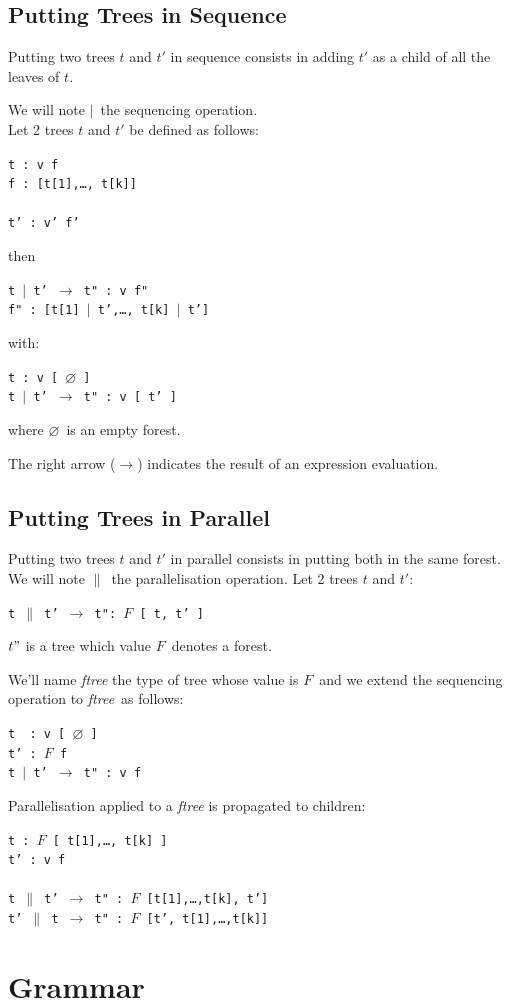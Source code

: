 \documentclass{article}
\newcommand{\op}	[1]		{\vspace{0mm}\begin{center}\colorbox{mygrey}{
							\begin{minipage}[t]{0.9\columnwidth} 
							{\small \texttt{#1}}
							\end{minipage}}\end{center}}
\newcommand{\nulltree}	{\ensuremath{\varnothing}}
\newcommand{\seq}		{\ensuremath{|}}
\newcommand{\paral}		{\ensuremath{\parallel}}
\newcommand{\foret}		{\ensuremath{F}}
\newcommand{\ftree}		{ftree}
\newcommand{\etc}		{…}
\begin{document}
\subsection{Putting Trees in Sequence}
Putting two trees $t$ and $t'$ in sequence consists in adding $t'$ as a child of all the leaves of $t$.


We will note \seq\ the sequencing operation. \\
Let 2 trees $t$ and $t'$ be defined as follows:
\op{t :  v f \\
f : [t[1],\etc, t[k]] \\
\\
t' :  v' f'
}
then
\op{t \seq\ t'  $\to$  t" : v f" \\
f" : [t[1] \seq\ t',\etc, t[k] \seq\ t']
}
with: 
\op{t :  v [ \nulltree\ ]\\
t \seq\ t'  $\to$  t" : v [ t' ]
}
where \nulltree\ is an empty forest.

The right arrow ($\to$) indicates the result of an expression evaluation.

\subsection{Putting Trees in Parallel}
Putting two trees $t$ and $t'$ in parallel consists in putting both in the same forest.
We will note \paral\ the parallelisation operation. 
Let 2 trees $t$ and $t'$:
\op{t \paral\ t'  $\to$  t": \foret\ [ t, t' ]
}
$t"$ is a tree which value \foret\ denotes a forest. 

We'll name \emph{\ftree} the type of tree whose value is \foret\ and we extend the sequencing operation to \emph{\ftree}\ as follows:
\op{t \ :  v [ \nulltree\ ]\\
t' :  \foret\ f\\
t \seq\ t'  $\to$  t" : v f
}

Parallelisation applied to a \emph{\ftree} is propagated to children: 
\op{t :  \foret\ [ t[1],\etc, t[k] ]\\
t' :  v f\\
\\
t \paral\ t'  $\to$  t" : \foret\ [t[1],\etc,t[k], t']\\
t' \paral\ t  $\to$  t" : \foret\ [t', t[1],\etc,t[k]]
}



\section{Grammar}\label{agram}
\end{document}
